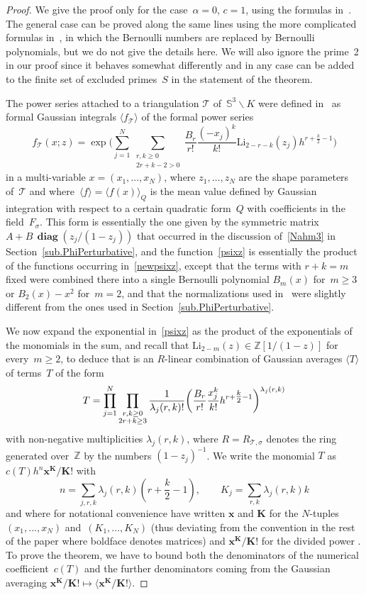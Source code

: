 \documentclass[pdftex]{sigma}
\numberwithin{equation}{section}
\def\calT{\mathcal T}
\def\calT{\mathcal T}
\def\l{\lambda}
\def\a{\alpha}
\def\l{\lambda}
\def\Z{\mathbb Z}
\def\i{^{-1}}
\def\a{\alpha}
\def\l{\lambda}
\def\s{\sigma}
\def\be{\begin{equation}}
\def\ee{\end{equation}}
\def\ssm{\smallsetminus}
\def\Li{\mathrm{Li}}
\def\bK{\mathbf K}
\def\bx{\mathbf x}
\def\diag{\operatorname{\mathbf{diag}}} %
\begin{document}
\begin{proof}
We give the proof only for the case~$\a=0$, $c=1$, using the formulas in~\cite{DG}.
The general case can be proved along the same lines using the more complicated
formulas in~\cite{DG2}, in which the Bernoulli numbers are replaced by Bernoulli
polynomials, but we do not give the details here.
We will also ignore the prime~2 in our proof since it behaves somewhat differently
and in any case can be added to the finite set of excluded primes~$S$ in the statement
of the theorem.

The power series \smash{$\Phi_0^{(K,\s)}(h)$} attached to a triangulation $\calT$
of~$\mathbb S^3\ssm K$ were defined in~\cite{DG} as formal Gaussian integrals
$\langle f_{\calT}\rangle$
of the formal power series
\be
\label{psixz}
f_{\calT}(x;z) = \exp\Bigg(\sum_{j=1}^N \sum_{\substack{r, k\ge0 \\ 2r+k-2 > 0}}
\frac{B_r}{r!} \frac{(-x_j)^k}{k!} \Li_{2-r-k}(z_j)  h^{r+\tfrac k2-1} \Bigg)
\ee
in a multi-variable $x=(x_1,\dots,x_N)$, where $z_1,\dots,z_N$ are the shape parameters
of~$\calT$ and where~${\langle f\rangle=\langle f(x)\rangle_Q}$ is the mean value
defined by Gaussian integration with respect to a certain quadratic form~$Q$ with
coefficients in the field~$F_\s$. This form is essentially the one given by the
symmetric matrix $A+B \,\diag(z_j/(1-z_j))$ that occurred in the discussion
of~\eqref{Nahm3}
in Section~\ref{sub.PhiPerturbative}, and the function~\eqref{psixz} is essentially
the product of the functions occurring in~\eqref{newpsixz}, except that the terms
with $r+k=m$ fixed were combined there into a single Bernoulli polynomial $B_m(x)$
for~$m\ge3$ or $B_2(x)-x^2$ for~$m=2$, and that the normalizations used in~\cite{DG}
were slightly different from the ones used in Section~\ref{sub.PhiPerturbative}.

We now expand the exponential in~\eqref{psixz} as the product of the exponentials
of the monomials in the sum, and recall that $\Li_{2-m}(z)\in\Z[1/(1-z)]$ for
every~$m\ge2$, to deduce that \smash{$\Phi_\a^{(K,\s)}(h)=\langle f_{\calT}\rangle$} is an
$R$-linear combination of Gaussian averages $\langle T\rangle$ of terms~$T$ of the
form
\be
\label{term}
T = \prod_{j=1}^N\prod_{\substack{r, k\ge0 \\ 2r+k\ge3\substack}}
\frac1{\l_j(r,k)!} \biggl(\frac{B_r}{r!}
\frac{x_j^k}{k!} h^{r+\tfrac k2-1}\biggr)^{\l_j(r,k)}
\ee
with non-negative multiplicities $\l_j(r,k)$, where $R=R_{\calT,\s}$ denotes the
ring generated over~$\Z$ by the numbers $(1-z_j)\i$. We write the monomial $T$ as
$c(T) h^n \bx^\bK/\bK!$ with
\be
\label{nAndK}
n = \sum_{j,r,k}\l_j(r,k)\left(r+\frac k2-1\right),\qquad K_j=\sum_{r,k}\l_j(r,k)k
\ee
and where for notational convenience have written $\bx$ and $\bK$ for the
$N$-tuples $(x_1,\dots,x_N)$ and~${(K_1,\dots,K_N)}$ (thus deviating from the
convention in the rest of the paper where boldface denotes matrices) and
$\bx^\bK/\bK!$ for the divided power . To prove the theorem,
we have to bound both the denominators of the numerical coefficient~$c(T)$ and the
further denominators coming from the Gaussian averaging
$ \bx^\bK/\bK! \mapsto\big\langle\bx^\bK/\bK! \big\rangle $.


\end{proof}
\end{document}
